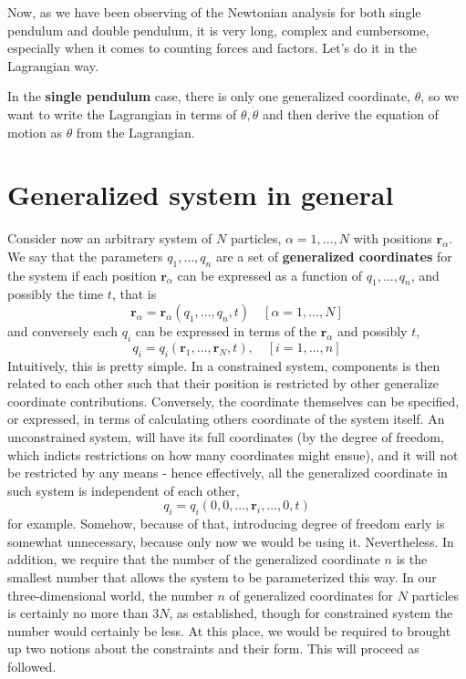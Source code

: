 Now, as we have been observing of the Newtonian analysis for both single pendulum and double pendulum, it is very long, complex and cumbersome, especially when it comes to counting forces and factors. Let's do it in the Lagrangian way. 

In the \textbf{single pendulum} case, there is only one generalized coordinate, $\theta$, so we want to write the Lagrangian in terms of $\theta,\dot{\theta}$ and then derive the equation of motion as $\theta$ from the Lagrangian. 

\section{Generalized system in general}
Consider now an arbitrary system of $N$ particles, $\alpha = 1,\dots, N$ with positions $\mathbf{r}_{\alpha}$. We say that the parameters $q_{1},\dots,q_{n}$ are a set of \textbf{generalized coordinates} for the system if each position $\mathbf{r}_{\alpha}$ can be expressed as a function of $q_{1},\dots,q_{n}$, and possibly the time $t$, that is
\begin{equation}
  \mathbf{r}_{\alpha} = \mathbf{r}_{\alpha} (q_{1},\dots,q_{n},t)\quad [\alpha = 1,\dots,N]
\end{equation}
and conversely each $q_{i}$ can be expressed in terms of the $\mathbf{r}_{\alpha}$ and possibly $t$, 
\begin{equation}
  q_{i} = q_{i} (\mathbf{r}_{1},\dots,\mathbf{r}_{N},t), \quad [i=1,\dots,n]
\end{equation}
Intuitively, this is pretty simple. In a constrained system, components is then related to each other such that their position is restricted by other generalize coordinate contributions. Conversely, the coordinate themselves can be specified, or expressed, in terms of calculating others coordinate of the system itself. An unconstrained system, will have its full coordinates (by the degree of freedom, which indicts restrictions on how many coordinates might ensue), and it will not be restricted by any means - hence effectively, all the generalized coordinate in such system is independent of each other, 
\begin{equation}
  q_{i} = q_{i}(0,0,\dots, \mathbf{r}_{i},\dots,0,t)
\end{equation}
for example. Somehow, because of that, introducing degree of freedom early is somewhat unnecessary, because only now we would be using it. Nevertheless. In addition, we require that the number of the generalized coordinate $n$ is the smallest number that allows the system to be parameterized this way. In our three-dimensional world, the number $n$ of generalized coordinates for $N$ particles is certainly no more than $3N$, as established, though for constrained system the number would certainly be less. At this place, we would be required to brought up two notions about the constraints and their form. This will proceed as followed. 

